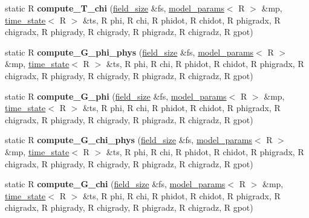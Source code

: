 \begin{DoxyCompactItemize}
\item 
\hypertarget{structgrid__funcs_ae68b8f6ac20a9625b29a39f6e59d6f7d}{
static R {\bfseries compute\_\-T\_\-chi} (\hyperlink{structfield__size}{field\_\-size} \&fs, \hyperlink{structmodel__params}{model\_\-params}$<$ R $>$ \&mp, \hyperlink{structtime__state}{time\_\-state}$<$ R $>$ \&ts, R phi, R chi, R phidot, R chidot, R phigradx, R chigradx, R phigrady, R chigrady, R phigradz, R chigradz, R gpot)}
\label{structgrid__funcs_ae68b8f6ac20a9625b29a39f6e59d6f7d}

\item 
\hypertarget{structgrid__funcs_a7dd6710638fa2f82c38c33ee91a88e74}{
static R {\bfseries compute\_\-G\_\-phi\_\-phys} (\hyperlink{structfield__size}{field\_\-size} \&fs, \hyperlink{structmodel__params}{model\_\-params}$<$ R $>$ \&mp, \hyperlink{structtime__state}{time\_\-state}$<$ R $>$ \&ts, R phi, R chi, R phidot, R chidot, R phigradx, R chigradx, R phigrady, R chigrady, R phigradz, R chigradz, R gpot)}
\label{structgrid__funcs_a7dd6710638fa2f82c38c33ee91a88e74}

\item 
\hypertarget{structgrid__funcs_a007630f31ee559741783aa0a007641df}{
static R {\bfseries compute\_\-G\_\-phi} (\hyperlink{structfield__size}{field\_\-size} \&fs, \hyperlink{structmodel__params}{model\_\-params}$<$ R $>$ \&mp, \hyperlink{structtime__state}{time\_\-state}$<$ R $>$ \&ts, R phi, R chi, R phidot, R chidot, R phigradx, R chigradx, R phigrady, R chigrady, R phigradz, R chigradz, R gpot)}
\label{structgrid__funcs_a007630f31ee559741783aa0a007641df}

\item 
\hypertarget{structgrid__funcs_a517079423086048162b1f9eba0c140e1}{
static R {\bfseries compute\_\-G\_\-chi\_\-phys} (\hyperlink{structfield__size}{field\_\-size} \&fs, \hyperlink{structmodel__params}{model\_\-params}$<$ R $>$ \&mp, \hyperlink{structtime__state}{time\_\-state}$<$ R $>$ \&ts, R phi, R chi, R phidot, R chidot, R phigradx, R chigradx, R phigrady, R chigrady, R phigradz, R chigradz, R gpot)}
\label{structgrid__funcs_a517079423086048162b1f9eba0c140e1}

\item 
\hypertarget{structgrid__funcs_a83a9815afe5d0f3db972f3397598dac8}{
static R {\bfseries compute\_\-G\_\-chi} (\hyperlink{structfield__size}{field\_\-size} \&fs, \hyperlink{structmodel__params}{model\_\-params}$<$ R $>$ \&mp, \hyperlink{structtime__state}{time\_\-state}$<$ R $>$ \&ts, R phi, R chi, R phidot, R chidot, R phigradx, R chigradx, R phigrady, R chigrady, R phigradz, R chigradz, R gpot)}
\label{structgrid__funcs_a83a9815afe5d0f3db972f3397598dac8}


\end{DoxyCompactItemize}
